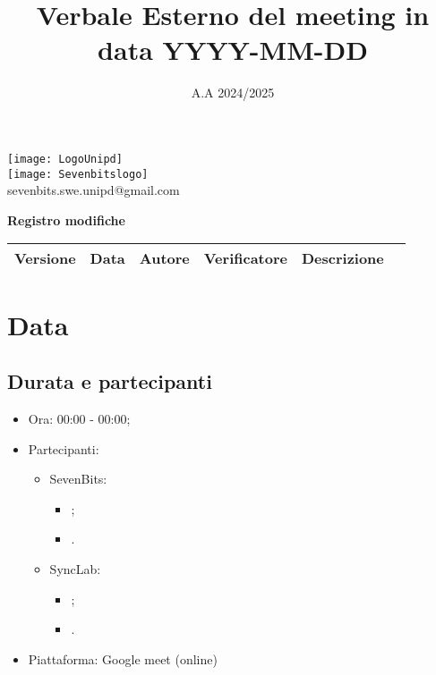 \documentclass[10pt]{article}
\title{Verbale Esterno del meeting in data YYYY-MM-DD} %
\date{A.A 2024/2025}
\begin{document}
\maketitle
\center 
\texttt{[image: LogoUnipd]}\\
\texttt{[image: Sevenbitslogo]}\\
sevenbits.swe.unipd@gmail.com\\
\vspace{2mm}

\textbf{Registro modifiche}\\
\vspace{2mm}
\begin{tabular}{|l|l|l|l|l|l|}
\hline
\textbf{Versione} & \textbf{Data} & \textbf{Autore} & \textbf{Verificatore} & \textbf{Descrizione} \\
\hline
\end{tabular}

\newpage
\raggedright
\tableofcontents

\newpage
\section{Data} %
\subsection{Durata e partecipanti}
\begin{itemize}
\item Ora: 00:00 - 00:00; %
\item Partecipanti: 	
	\begin{itemize}
            \item SevenBits:
            \begin{itemize}
                \item ;
                \item .
	    \end{itemize}
            \item SyncLab:
            \begin{itemize}
                \item ;
                \item .
	    \end{itemize}
	\end{itemize}
\item Piattaforma: Google meet (online)
\end{itemize}
\end{document}
